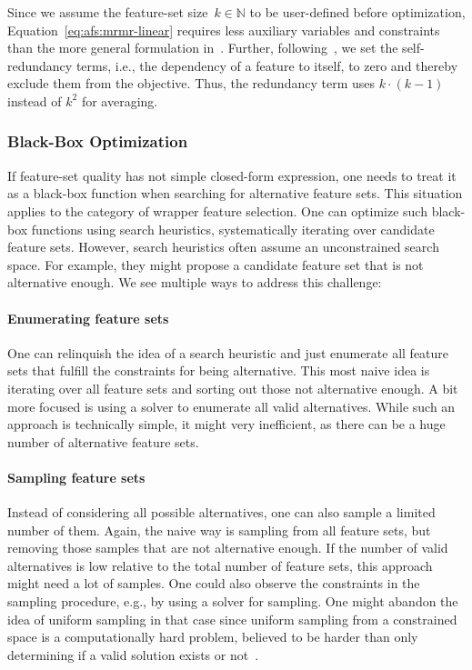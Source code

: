 \documentclass{article}
\theoremstyle{definition}
\begin{document}
Since we assume the feature-set size~$k \in \mathbb{N}$ to be user-defined before optimization, Equation~\ref{eq:afs:mrmr-linear} requires less auxiliary variables and constraints than the more general formulation in~\cite{nguyen2009optimizing, nguyen2010towards}.
Further, following~\cite{nguyen2014effective}, we set the self-redundancy terms, i.e., the dependency of a feature to itself, to zero and thereby exclude them from the objective.
Thus, the redundancy term uses $k \cdot (k-1)$ instead of $k^2$ for averaging.

\subsubsection{Black-Box Optimization}
\label{sec:afs:approach:objectives:black-box}

If feature-set quality has not simple closed-form expression, one needs to treat it as a black-box function when searching for alternative feature sets.
This situation applies to the category of wrapper feature selection.
One can optimize such black-box functions using search heuristics, systematically iterating over candidate feature sets.
However, search heuristics often assume an unconstrained search space.
For example, they might propose a candidate feature set that is not alternative enough.
We see multiple ways to address this challenge:

\paragraph{Enumerating feature sets}

One can relinquish the idea of a search heuristic and just enumerate all feature sets that fulfill the constraints for being alternative.
This most naive idea is iterating over all feature sets and sorting out those not alternative enough.
A bit more focused is using a solver to enumerate all valid alternatives.
While such an approach is technically simple, it might very inefficient, as there can be a huge number of alternative feature sets.

\paragraph{Sampling feature sets}

Instead of considering all possible alternatives, one can also sample a limited number of them.
Again, the naive way is sampling from all feature sets, but removing those samples that are not alternative enough.
If the number of valid alternatives is low relative to the total number of feature sets, this approach might need a lot of samples.
One could also observe the constraints in the sampling procedure, e.g., by using a solver for sampling.
One might abandon the idea of uniform sampling in that case since uniform sampling from a constrained space is a computationally hard problem, believed to be harder than only determining if a valid solution exists or not~\cite{ermon2012uniform}.
\end{document}

